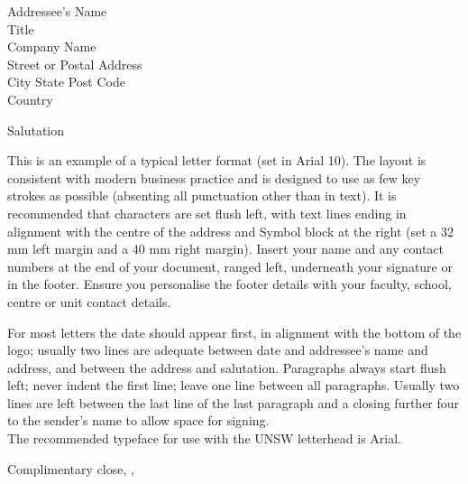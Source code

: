 \documentclass[10pt, a4paper]{letter} %
\begin{document}
\begin{letter}{Addressee’s Name \\
Title \\
Company Name \\
Street or Postal Address \\
City State Post Code \\
Country}

\opening{Salutation}

This is an example of a typical letter format (set in Arial 10). The layout is consistent with modern business practice and is designed to use as few key strokes as possible (absenting all punctuation other than in text). It is recommended that characters are set flush left, with text lines ending in alignment with the centre of the address and Symbol block at the right (set a 32 mm left margin and a 40 mm right margin). Insert your name and any contact numbers at the end of your document, ranged left, underneath your signature or in the footer. Ensure you personalise the footer details with your faculty, school, centre or unit contact details. 

For most letters the date should appear first, in alignment with the bottom of the logo; usually two lines are adequate between date and addressee’s name and address, and between the address and salutation. Paragraphs always start flush left; never indent the first line; leave one line between all paragraphs. Usually two lines are left between the last line of the last paragraph and a closing further four to the sender’s name to allow space for signing. \\[2\baselineskip]

The recommended typeface for use with the UNSW letterhead is Arial. 
\\[2\baselineskip]

\closing{Complimentary close, ,}

\end{letter}
\end{document}
